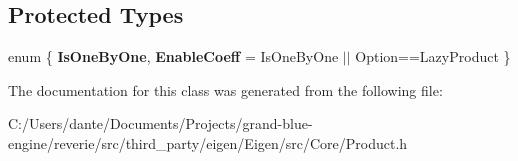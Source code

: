 \subsection*{Protected Types}
\begin{DoxyCompactItemize}
\item 
\mbox{\label{class_eigen_1_1_product_impl_3_01_lhs_00_01_rhs_00_01_option_00_01_dense_01_4_a621fda1730fd2d0c8d80ce64e80d90fb}} 
enum \{ {\bfseries Is\+One\+By\+One}, 
{\bfseries Enable\+Coeff} = Is\+One\+By\+One $\vert$$\vert$ Option==Lazy\+Product
 \}
\end{DoxyCompactItemize}


The documentation for this class was generated from the following file\+:\begin{DoxyCompactItemize}
\item 
C\+:/\+Users/dante/\+Documents/\+Projects/grand-\/blue-\/engine/reverie/src/third\+\_\+party/eigen/\+Eigen/src/\+Core/Product.\+h\end{DoxyCompactItemize}
